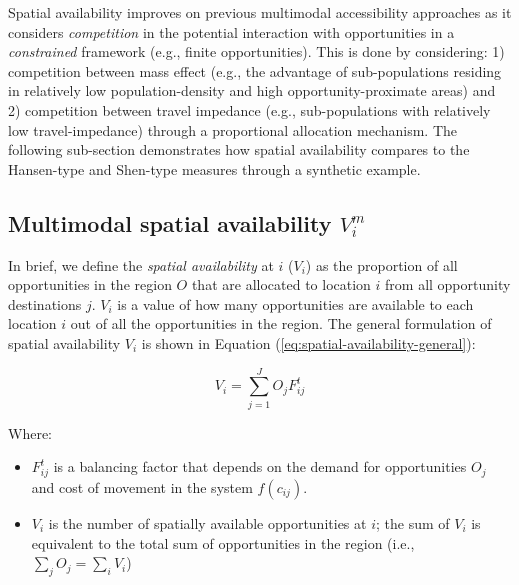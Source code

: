 \documentclass[10pt,letterpaper]{article}
\providecommand{\tightlist}{%
  \setlength{\itemsep}{0pt}\setlength{\parskip}{0pt}}
\begin{document}
Spatial availability improves on previous multimodal accessibility
approaches as it considers \emph{competition} in the potential
interaction with opportunities in a \emph{constrained} framework (e.g.,
finite opportunities). This is done by considering: 1) competition
between mass effect (e.g., the advantage of sub-populations residing in
relatively low population-density and high opportunity-proximate areas)
and 2) competition between travel impedance (e.g., sub-populations with
relatively low travel-impedance) through a proportional allocation
mechanism. The following sub-section demonstrates how spatial
availability compares to the Hansen-type and Shen-type measures through
a synthetic example.

\hypertarget{multimodal-spatial-availability-v_im}{%
\subsection{\texorpdfstring{Multimodal spatial availability
\(V_i^m\)}{Multimodal spatial availability V\_i\^{}m}}\label{multimodal-spatial-availability-v_im}}

In brief, we define the \emph{spatial availability} at \(i\) (\(V_{i}\))
as the proportion of all opportunities in the region \(O\) that are
allocated to location \(i\) from all opportunity destinations \(j\).
\(V_{i}\) is a value of how many opportunities are available to each
location \(i\) out of all the opportunities in the region. The general
formulation of spatial availability \(V_{i}\) is shown in Equation
(\ref{eq:spatial-availability-general}):

\begin{equation}
\label{eq:spatial-availability-general}
V_i = \sum_{j=1}^J O_jF^t_{ij}
\end{equation}

\noindent Where:

\begin{itemize}
\tightlist
\item
  \(F^t_{ij}\) is a balancing factor that depends on the demand for
  opportunities \(O_j\) and cost of movement in the system
  \(f(c_{ij})\).
\item
  \(V_i\) is the number of spatially available opportunities at \(i\);
  the sum of \(V_{i}\) is equivalent to the total sum of opportunities
  in the region (i.e., \(\sum_j O_j = \sum_i V_i\))
\end{itemize}
\end{document}
